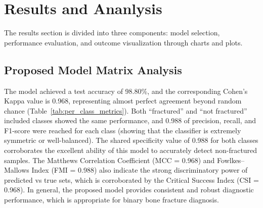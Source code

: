 \documentclass{styles/svproc}
\begin{document}
\section{Results and Ananlysis}\label{results}
The results section is divided into three components: model selection, performance evaluation, and outcome visualization through charts and plots.




\subsection{Proposed Model Matrix Analysis}
The model achieved a test accuracy of 98.80\%, and the corresponding Cohen’s Kappa value is 0.968, representing almost perfect agreement beyond random chance (Table~\ref{tab:per_class_metrics}). Both “fractured” and “not fractured” included classes showed the same performance, and 0.988 of precision, recall, and F1-score were reached for each class (showing that the classifier is extremely symmetric or well-balanced). The shared specificity value of 0.988 for both classes corroborates the excellent ability of this model to accurately detect non-fractured samples. The Matthews Correlation Coefficient (MCC = 0.968) and Fowlkes–Mallows Index (FMI = 0.988) also indicate the strong discriminatory power of predicted vs true sets, which is corroborated by the Critical Success Index (CSI = 0.968). In general, the proposed model provides consistent and robust diagnostic performance, which is appropriate for binary bone fracture diagnosis.
\end{document}
